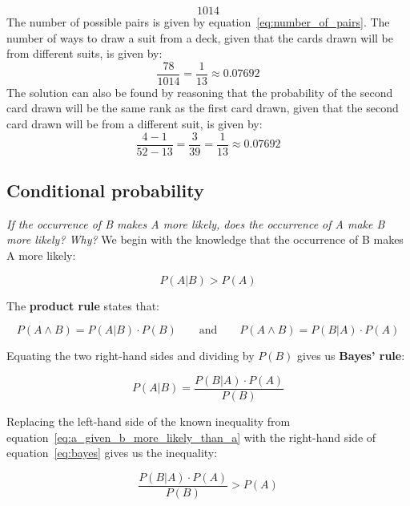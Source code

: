 \begin{enumerate}[label=\alph*)]
\begin{equation}
1014
\end{equation}
The number of possible pairs is given by equation~\ref{eq:number_of_pairs}. The number of ways to draw a suit from a deck, given that the cards drawn will be from different suits, is given by:
\begin{equation}
\frac{78}{1014} = \frac{1}{13} \approx 0.07692
\end{equation}
The solution can also be found by reasoning that the probability of the second card drawn will be the same rank as the first card drawn, given that the second card drawn will be from a different suit, is given by:
\begin{equation}
\frac{4 - 1}{52 - 13} = \frac{3}{39} = \frac{1}{13} \approx 0.07692
\end{equation}
\end{enumerate}

\subsection{Conditional probability}

\textit{If the occurrence of B makes A more likely, does the occurrence of A make B more likely? Why?}\vspace{0.1cm}
We begin with the knowledge that the occurrence of B makes A more likely:

\begin{equation}
\label{eq:a_given_b_more_likely_than_a}
P(A \vert B) > P(A)
\end{equation}

The \textbf{product rule} states that:

\begin{equation}
P(A \land B) = P(A \vert B) \cdot P(B)
\qquad\text{and}\qquad
P(A \land B) = P(B \vert A) \cdot P(A)
\end{equation}

Equating the two right-hand sides and dividing by $P(B)$ gives us \textbf{Bayes' rule}:

\begin{equation}
\label{eq:bayes}
P(A \vert B) = \frac{P(B \vert A) \cdot P(A)}{P(B)}
\end{equation}

Replacing the left-hand side of the known inequality from equation~\ref{eq:a_given_b_more_likely_than_a} with the right-hand side of equation~\ref{eq:bayes} gives us the inequality:

\begin{equation}
\frac{P(B \vert A) \cdot P(A)}{P(B)} > P(A)
\end{equation}

